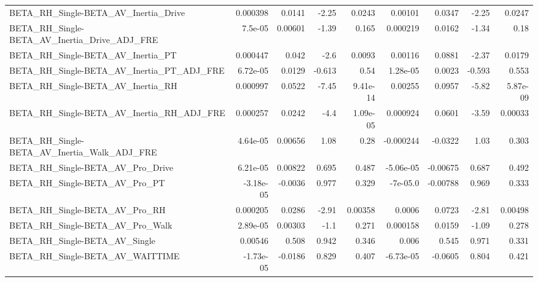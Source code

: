 \begin{tabular}{lrrrrrrrr}
BETA\_RH\_Single-BETA\_AV\_Inertia\_Drive               &    0.000398 &       0.0141 &    -2.25 &   0.0243 &    0.00101 &      0.0347 &        -2.25 &        0.0247 \\
BETA\_RH\_Single-BETA\_AV\_Inertia\_Drive\_ADJ\_FRE       &     7.5e-05 &      0.00601 &    -1.39 &    0.165 &   0.000219 &      0.0162 &        -1.34 &          0.18 \\
BETA\_RH\_Single-BETA\_AV\_Inertia\_PT                  &    0.000447 &        0.042 &     -2.6 &   0.0093 &    0.00116 &      0.0881 &        -2.37 &        0.0179 \\
BETA\_RH\_Single-BETA\_AV\_Inertia\_PT\_ADJ\_FRE          &    6.72e-05 &       0.0129 &   -0.613 &     0.54 &   1.28e-05 &      0.0023 &       -0.593 &         0.553 \\
BETA\_RH\_Single-BETA\_AV\_Inertia\_RH                  &    0.000997 &       0.0522 &    -7.45 & 9.41e-14 &    0.00255 &      0.0957 &        -5.82 &      5.87e-09 \\
BETA\_RH\_Single-BETA\_AV\_Inertia\_RH\_ADJ\_FRE          &    0.000257 &       0.0242 &     -4.4 & 1.09e-05 &   0.000924 &      0.0601 &        -3.59 &       0.00033 \\
BETA\_RH\_Single-BETA\_AV\_Inertia\_Walk\_ADJ\_FRE        &    4.64e-05 &      0.00656 &     1.08 &     0.28 &  -0.000244 &     -0.0322 &         1.03 &         0.303 \\
BETA\_RH\_Single-BETA\_AV\_Pro\_Drive                   &    6.21e-05 &      0.00822 &    0.695 &    0.487 &  -5.06e-05 &    -0.00675 &        0.687 &         0.492 \\
BETA\_RH\_Single-BETA\_AV\_Pro\_PT                      &   -3.18e-05 &      -0.0036 &    0.977 &    0.329 &   -7e-05.0 &    -0.00788 &        0.969 &         0.333 \\
BETA\_RH\_Single-BETA\_AV\_Pro\_RH                      &    0.000205 &       0.0286 &    -2.91 &  0.00358 &     0.0006 &      0.0723 &        -2.81 &       0.00498 \\
BETA\_RH\_Single-BETA\_AV\_Pro\_Walk                    &    2.89e-05 &      0.00303 &     -1.1 &    0.271 &   0.000158 &      0.0159 &        -1.09 &         0.278 \\
BETA\_RH\_Single-BETA\_AV\_Single                      &     0.00546 &        0.508 &    0.942 &    0.346 &      0.006 &       0.545 &        0.971 &         0.331 \\
BETA\_RH\_Single-BETA\_AV\_WAITTIME                    &   -1.73e-05 &      -0.0186 &    0.829 &    0.407 &  -6.73e-05 &     -0.0605 &        0.804 &         0.421 \\

\end{tabular}
